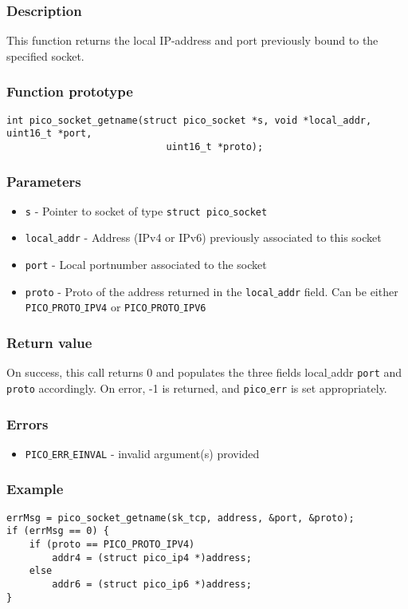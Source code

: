\subsubsection*{Description}
This function returns the local IP-address and port previously bound to the specified socket.

\subsubsection*{Function prototype}
\begin{verbatim}
int pico_socket_getname(struct pico_socket *s, void *local_addr, uint16_t *port, 
                            uint16_t *proto);
\end{verbatim}


\subsubsection*{Parameters}
\begin{itemize}[noitemsep]
\item \texttt{s} - Pointer to socket of type \texttt{struct pico$\_$socket}
\item \texttt{local$\_$addr} - Address (IPv4 or IPv6) previously associated to this socket
\item \texttt{port} - Local portnumber associated to the socket
\item \texttt{proto} - Proto of the address returned in the \texttt{local$\_$addr} field. Can be either \texttt{PICO$\_$PROTO$\_$IPV4} or \texttt{PICO$\_$PROTO$\_$IPV6}
\end{itemize}

\subsubsection*{Return value}
On success, this call returns 0 and populates the three fields {local$\_$addr} \texttt{port} and \texttt{proto} accordingly.
On error, -1 is returned, and \texttt{pico$\_$err} is set appropriately.

\subsubsection*{Errors}
\begin{itemize}[noitemsep]
\item \texttt{PICO$\_$ERR$\_$EINVAL} - invalid argument(s) provided
\end{itemize}

\subsubsection*{Example}
\begin{verbatim}
errMsg = pico_socket_getname(sk_tcp, address, &port, &proto);
if (errMsg == 0) {
    if (proto == PICO_PROTO_IPV4)
        addr4 = (struct pico_ip4 *)address;
    else
        addr6 = (struct pico_ip6 *)address;
}
\end{verbatim}

